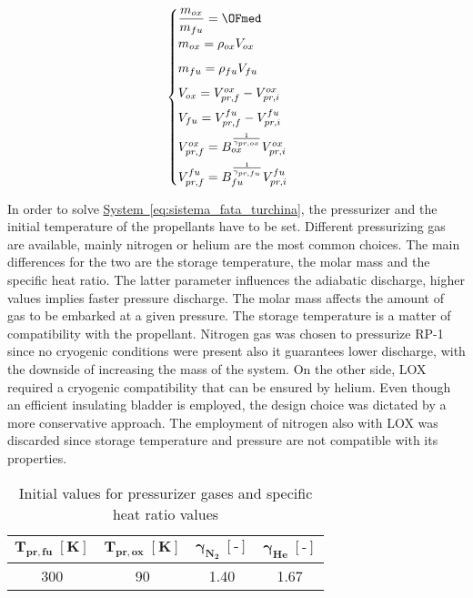 \begin{equation}
    \begin{cases}
    \dfrac{m_{ox}}{m_{fu}} = \OFmed
    \\[5pt]
    m_{ox} = \rho_{ox}V_{ox}
    \\[5pt]
    m_{fu} = \rho_{fu}V_{fu}
    \\[5pt]
    V_{ox} = V_{pr, f}^{ox} - V_{pr, i}^{ox}
    \\[5pt]
    V_{fu} = V_{pr, f}^{fu} - V_{pr, i}^{fu}
    \\[5pt]
    V_{pr,f}^{ox} = B_{ox}^{\frac{1}{\gamma_{pr,ox}}}V_{pr, i}^{ox}
    \\[5pt]
    V_{pr,f}^{fu} = B_{fu}^{\frac{1}{\gamma_{pr,fu}}}V_{pr, i}^{fu}
    \end{cases}\
    \label{eq:sistema_fata_turchina}
\end{equation}

\vspace{3mm}

In order to solve \hyperref[eq:sistema_fata_turchina]{System~\ref*{eq:sistema_fata_turchina}}, the pressurizer and the initial temperature of the propellants have to be set. Different pressurizing gas are available, mainly nitrogen or helium are the most common choices.
The main differences for the two are the storage temperature, the molar mass and the specific heat ratio. The latter parameter influences the adiabatic discharge, higher values implies faster pressure discharge.
The molar mass affects the amount of gas to be embarked at a given pressure. The storage temperature is a matter of compatibility with the propellant.
Nitrogen gas was chosen to pressurize RP-1 since no cryogenic conditions were present also it guarantees lower discharge, with the downside of increasing the mass of the system.
On the other side, LOX required a cryogenic compatibility that can be ensured by helium. Even though an efficient insulating bladder is employed, the design choice was dictated by a more conservative approach.
The employment of nitrogen also with LOX was discarded since storage temperature and pressure are not compatible with its properties\cite{nist}.
\begin{table}[H]
    \renewcommand{\arraystretch}{1.2}
    \centering
    \begin{tabular}{|c|c|c|c|}
        \hline
        $\boldsymbol{T_{pr,fu} \; [\textbf{K}]}$ & $\boldsymbol{T_{pr,ox} \; [\textbf{K}]}$ & $\boldsymbol{\gamma_{N_2} \; [\textbf{-}]}$  & $\boldsymbol{\gamma_{He} \; [\textbf{-}]}$ \\
        \hline
        \hline
        300 & 90 & 1.40 & 1.67 \\
        \hline
    \end{tabular}
    \caption{Initial values for pressurizer gases and specific heat ratio values}
    \label{table:press_value}
\end{table}

